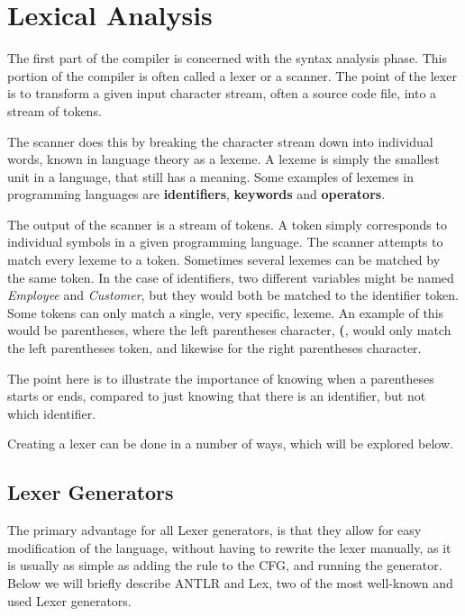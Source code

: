 \section{Lexical Analysis}
The first part of the compiler is concerned with the syntax analysis phase.
This portion of the compiler is often called a lexer or a scanner.
The point of the lexer is to transform a given input character stream, often a source code file, into a stream of tokens.

The scanner does this by breaking the character stream down into individual words, known in language theory as a lexeme.
A lexeme is simply the smallest unit in a language, that still has a meaning.
Some examples of lexemes in programming languages are \textbf{identifiers}, \textbf{keywords} and \textbf{operators}.

The output of the scanner is a stream of tokens.
A token simply corresponds to individual symbols in a given programming language.
The scanner attempts to match every lexeme to a token.
Sometimes several lexemes can be matched by the same token.
In the case of identifiers, two different variables might be named \textit{Employee} and \textit{Customer}, but they would both be matched to the identifier token.
Some tokens can only match a single, very specific, lexeme.
An example of this would be parentheses, where the left parentheses character, \textbf{(}, would only match the left parentheses token, and likewise for the right parentheses character.

The point here is to illustrate the importance of knowing when a parentheses starts or ends, compared to just knowing that there is an identifier, but not which identifier.

Creating a lexer can be done in a number of ways, which will be explored below.

\subsection{Lexer Generators}
The primary advantage for all Lexer generators, is that they allow for easy modification of the language, without having to  rewrite the lexer manually, as it is usually as simple as adding the rule to the CFG, and running the generator.
Below we will briefly describe ANTLR and Lex, two of the most well-known and used Lexer generators.

